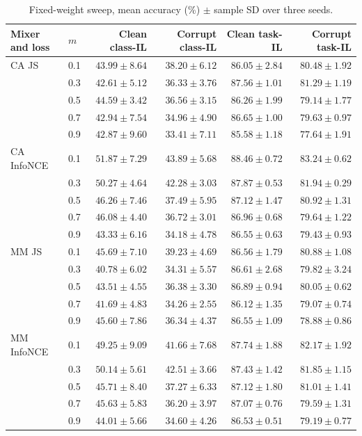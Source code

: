 \begin{table}[ht]
\centering\small
\begin{tabular}{llrrrr}
\toprule
Mixer and loss & $m$ & Clean class-IL & Corrupt class-IL & Clean task-IL & Corrupt task-IL \\
\midrule
CA JS & 0.1 & $43.99\pm8.64$ & $38.20\pm6.12$ & $86.05\pm2.84$ & $80.48\pm1.92$ \\
 & 0.3 & $42.61\pm5.12$ & $36.33\pm3.76$ & $87.56\pm1.01$ & $81.29\pm1.19$ \\
 & 0.5 & $44.59\pm3.42$ & $36.56\pm3.15$ & $86.26\pm1.99$ & $79.14\pm1.77$ \\
 & 0.7 & $42.94\pm7.54$ & $34.96\pm4.90$ & $86.65\pm1.00$ & $79.63\pm0.97$ \\
 & 0.9 & $42.87\pm9.60$ & $33.41\pm7.11$ & $85.58\pm1.18$ & $77.64\pm1.91$ \\
\midrule
CA InfoNCE & 0.1 & $51.87\pm7.29$ & $43.89\pm5.68$ & $88.46\pm0.72$ & $83.24\pm0.62$ \\
 & 0.3 & $50.27\pm4.64$ & $42.28\pm3.03$ & $87.87\pm0.53$ & $81.94\pm0.29$ \\
 & 0.5 & $46.26\pm7.46$ & $37.49\pm5.95$ & $87.12\pm1.47$ & $80.92\pm1.31$ \\
 & 0.7 & $46.08\pm4.40$ & $36.72\pm3.01$ & $86.96\pm0.68$ & $79.64\pm1.22$ \\
 & 0.9 & $43.33\pm6.16$ & $34.18\pm4.78$ & $86.55\pm0.63$ & $79.43\pm0.93$ \\
\midrule
MM JS & 0.1 & $45.69\pm7.10$ & $39.23\pm4.69$ & $86.56\pm1.79$ & $80.88\pm1.08$ \\
 & 0.3 & $40.78\pm6.02$ & $34.31\pm5.57$ & $86.61\pm2.68$ & $79.82\pm3.24$ \\
 & 0.5 & $43.51\pm4.55$ & $36.38\pm3.30$ & $86.89\pm0.94$ & $80.05\pm0.62$ \\
 & 0.7 & $41.69\pm4.83$ & $34.26\pm2.55$ & $86.12\pm1.35$ & $79.07\pm0.74$ \\
 & 0.9 & $45.60\pm7.86$ & $36.34\pm4.37$ & $86.55\pm1.09$ & $78.88\pm0.86$ \\
\midrule
MM InfoNCE & 0.1 & $49.25\pm9.09$ & $41.66\pm7.68$ & $87.74\pm1.88$ & $82.17\pm1.92$ \\
 & 0.3 & $50.14\pm5.61$ & $42.51\pm3.66$ & $87.43\pm1.42$ & $81.85\pm1.15$ \\
 & 0.5 & $45.71\pm8.40$ & $37.27\pm6.33$ & $87.12\pm1.80$ & $81.01\pm1.41$ \\
 & 0.7 & $45.63\pm5.83$ & $36.20\pm3.97$ & $87.07\pm0.76$ & $79.59\pm1.31$ \\
 & 0.9 & $44.01\pm5.66$ & $34.60\pm4.26$ & $86.53\pm0.51$ & $79.19\pm0.77$ \\
\bottomrule
\end{tabular}
\caption{Fixed-weight sweep, mean accuracy (\%) $\pm$ sample SD over three seeds.}\label{tab:sd}
\end{table}
